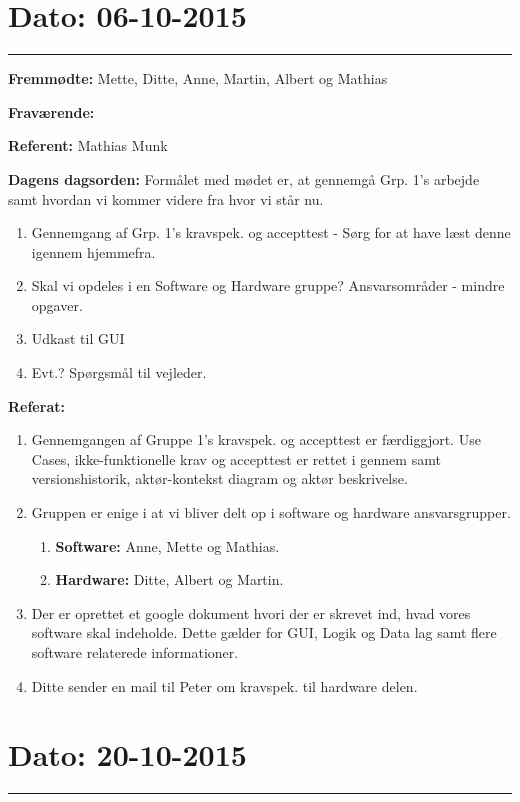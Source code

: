 \section{Dato: 06-10-2015}
\hrule

\textbf{Fremmødte:} Mette, Ditte, Anne, Martin, Albert og Mathias 

\textbf{Fraværende:}

\textbf{Referent:} Mathias Munk

\textbf{Dagens dagsorden:}
\newline
Formålet med mødet er, at gennemgå Grp. 1's arbejde samt hvordan vi kommer videre fra hvor vi står nu.
\begin{enumerate}
\item Gennemgang af Grp. 1's kravspek. og accepttest - Sørg for at have læst denne igennem hjemmefra.

\item Skal vi opdeles i en Software og Hardware gruppe? Ansvarsområder - mindre opgaver.

\item Udkast til GUI

\item Evt.? Spørgsmål til vejleder.
\end{enumerate}

\textbf{Referat:}
\newline 
\begin{enumerate}
\item Gennemgangen af Gruppe 1's kravspek. og accepttest er færdiggjort. Use Cases, ikke-funktionelle krav og accepttest er rettet i gennem samt versionshistorik, aktør-kontekst diagram og aktør beskrivelse. 
\item Gruppen er enige i at vi bliver delt op i	software og hardware ansvarsgrupper.
\begin{enumerate}
\item \textbf{Software: } Anne, Mette og Mathias.
\item \textbf{Hardware: } Ditte, Albert og Martin.
\end{enumerate}
\item Der er oprettet et google dokument hvori der er skrevet ind, hvad vores software skal indeholde. Dette gælder for GUI, Logik og Data lag samt flere software relaterede informationer.
\item Ditte sender en mail til Peter om kravspek. til hardware delen.
\end{enumerate}

\section{Dato: 20-10-2015}
\hrule

